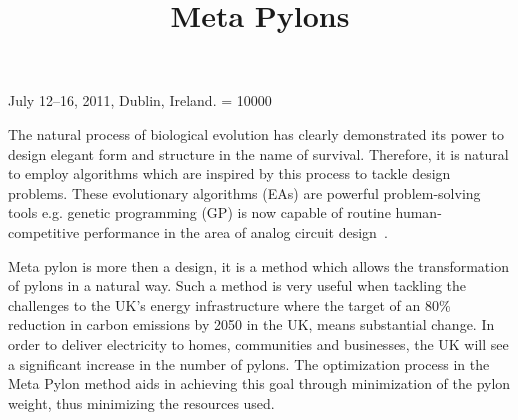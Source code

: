 \documentclass{sig-alternate}
\begin{document}

 {July 12--16, 2011, Dublin, Ireland.}
\widowpenalty = 10000

\title{Meta Pylons}
\author{
}

\maketitle




The natural process of biological evolution has clearly demonstrated
its power to design elegant form and structure in the name of
survival. Therefore, it is natural to employ algorithms which are
inspired by this process to tackle design problems. These evolutionary
algorithms (EAs) are powerful problem-solving tools e.g. genetic
programming (GP) is now capable of routine human-competitive
performance in the area of analog circuit design~\cite{koza2003}.

Meta pylon is more then a design, it is a method which allows the
transformation of pylons in a natural way. Such a method is very
useful when tackling the challenges to the UK's energy infrastructure
where the target of an 80\% reduction in carbon emissions by 2050 in
the UK, means substantial change. In order to deliver electricity to
homes, communities and businesses, the UK will see a significant
increase in the number of pylons. The optimization process in the Meta
Pylon method aids in achieving this goal through minimization of the
pylon weight, thus minimizing the resources used.
\end{document}
